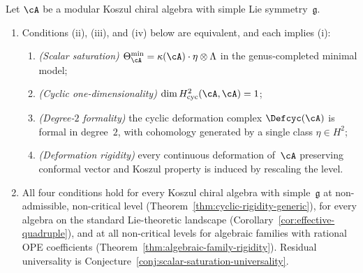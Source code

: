 \begin{proposition}
\label{prop:saturation-equivalence}
Let\/ $\cA$ be a modular Koszul chiral algebra with
simple Lie symmetry~$\mathfrak{g}$.
\begin{enumerate}[label=\textup{(\alph*)}]
\item Conditions
  \textup{(ii)},
  \textup{(iii)}, and
  \textup{(iv)} below are equivalent, and each implies
  \textup{(i)}:
\begin{enumerate}[label=\textup{(\roman*)}]
\item \emph{\textup{(}Scalar saturation\textup{)}}
  $\Theta_{\cA}^{\min} = \kappa(\cA)\cdot\eta\otimes\Lambda$
  in the genus-completed minimal model;
\item \emph{\textup{(}Cyclic one-dimensionality\textup{)}}
  $\dim H^2_{\mathrm{cyc}}(\cA, \cA) = 1$;
\item \emph{\textup{(}Degree-$2$ formality\textup{)}}
  the cyclic deformation complex $\Defcyc(\cA)$ is
  formal in degree~$2$, with cohomology generated by a
  single class $\eta \in H^2$;
\item \emph{\textup{(}Deformation rigidity\textup{)}}
  every continuous deformation of\/~$\cA$ preserving
  conformal vector and Koszul property is induced by
  rescaling the level.
\end{enumerate}
\item All four conditions hold for every
  Koszul chiral algebra with simple~$\mathfrak{g}$
  at non-admissible, non-critical level
  \textup{(}Theorem~\textup{\ref{thm:cyclic-rigidity-generic}}\textup{)},
  for every algebra on the standard Lie-theoretic landscape
  \textup{(}Corollary~\textup{\ref{cor:effective-quadruple}}\textup{)},
  and at all non-critical levels for algebraic families
  with rational OPE coefficients
  \textup{(}Theorem~\textup{\ref{thm:algebraic-family-rigidity}}\textup{)}.
  Residual universality is
  Conjecture~\textup{\ref{conj:scalar-saturation-universality}}.
\end{enumerate}
\end{proposition}

